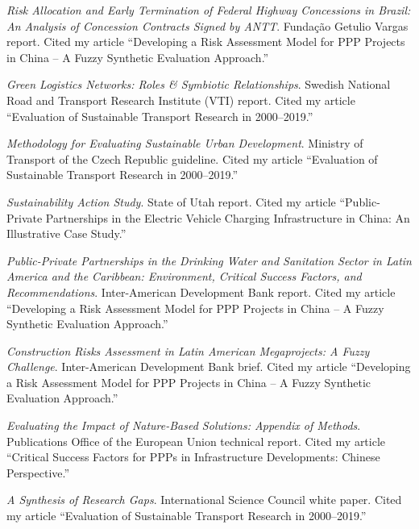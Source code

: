 \documentclass[11pt,a4paper]{report} %
\begin{document}
\begin{tablist}
        \item[2023] \tab{}\textit{Risk Allocation and Early Termination of Federal Highway Concessions in Brazil: An Analysis of Concession Contracts Signed by ANTT}. Fundação Getulio Vargas report. Cited my article “Developing a Risk Assessment Model for PPP Projects in China -- A Fuzzy Synthetic Evaluation Approach.”  
    
        \item[2023] \tab{}\textit{Green Logistics Networks: Roles \& Symbiotic Relationships}. Swedish National Road and Transport Research Institute (VTI) report. Cited my article “Evaluation of Sustainable Transport Research in 2000--2019.”  
    
        \item[2022] \tab{}\textit{Methodology for Evaluating Sustainable Urban Development}. Ministry of Transport of the Czech Republic guideline. Cited my article “Evaluation of Sustainable Transport Research in 2000--2019.”  

        \item[2022] \tab{}\textit{Sustainability Action Study}. State of Utah report. Cited my article “Public-Private Partnerships in the Electric Vehicle Charging Infrastructure in China: An Illustrative Case Study.”  
    
        \item[2021] \tab{}\textit{Public-Private Partnerships in the Drinking Water and Sanitation Sector in Latin America and the Caribbean: Environment, Critical Success Factors, and Recommendations}. Inter-American Development Bank report. Cited my article “Developing a Risk Assessment Model for PPP Projects in China -- A Fuzzy Synthetic Evaluation Approach.”  
    
        \item[2021] \tab{}\textit{Construction Risks Assessment in Latin American Megaprojects: A Fuzzy Challenge}. Inter-American Development Bank brief. Cited my article “Developing a Risk Assessment Model for PPP Projects in China -- A Fuzzy Synthetic Evaluation Approach.”  
    
        \item[2021] \tab{}\textit{Evaluating the Impact of Nature-Based Solutions: Appendix of Methods}. Publications Office of the European Union technical report. Cited my article “Critical Success Factors for PPPs in Infrastructure Developments: Chinese Perspective.”  
    
        \item[2021] \tab{}\textit{A Synthesis of Research Gaps}. International Science Council white paper. Cited my article “Evaluation of Sustainable Transport Research in 2000--2019.”  


\end{tablist}
\end{document}
